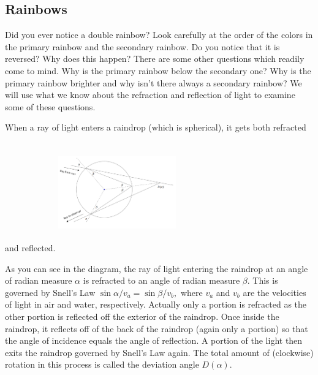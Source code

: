 





\subsection{Rainbows}
Did you ever notice a double rainbow?  
\InsertGraphic{} 
Look carefully at the order of the colors in the primary rainbow and
the secondary rainbow.  Do you notice that it is reversed?  Why does
this happen?  There are some other questions which readily come to
mind.  Why is the primary rainbow below the secondary one?  Why is the
primary rainbow brighter and why isn't there always a secondary
rainbow?  We will use what we know about the refraction and reflection
of light to examine some of these questions.

When a ray of light enters a raindrop (which is spherical), it gets
both refracted and reflected.
\includegraphics*[height=2in,width=2in]{Figures/Rainbow1}

As you can see in the diagram, the ray of light entering the raindrop
at an angle of radian measure $\alpha$ is refracted to an angle of radian
measure $\beta.$  This is governed by Snell's Law $\sin\alpha/v_a =\sin\beta/v_b,$
where $v_a$ and $v_b$ are the velocities of light in air and water,
respectively.  Actually only a portion is refracted as the other
portion is reflected off the exterior of the raindrop.  Once inside
the raindrop, it reflects off of the back of the raindrop (again only
a portion) so that the angle of incidence equals the angle of
reflection.  A portion of the light then exits the raindrop governed
by Snell's Law again.  The total amount of (clockwise) rotation in
this process is called the deviation angle $D(\alpha).$

